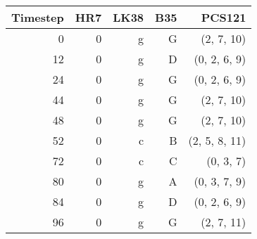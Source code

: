 \begin{tabular}{r|rrrr}
Timestep & HR7 & LK38 & B35  & PCS121        \\ \hline
0        & 0   & g    & G    & (2, 7, 10)    \\
12       & 0   & g    & D    & (0, 2, 6, 9)  \\
24       & 0   & g    & G    & (0, 2, 6, 9)  \\
44       & 0   & g    & G    & (2, 7, 10)    \\ \hline
48       & 0   & g    & G    & (2, 7, 10)    \\
52       & 0   & c    & B    & (2, 5, 8, 11) \\
72       & 0   & c    & C    & (0, 3, 7)     \\
80       & 0   & g    & A    & (0, 3, 7, 9)  \\
84       & 0   & g    & D    & (0, 2, 6, 9)  \\
96       & 0   & g    & G    & (2, 7, 11)    \\
\end{tabular}
